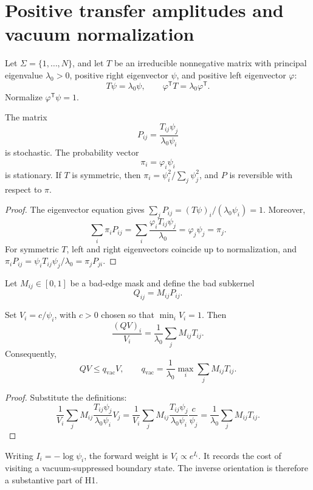\section{Positive transfer amplitudes and vacuum normalization}

Let \(\Sigma=\{1,\ldots,N\}\), and let \(T\) be an irreducible nonnegative
matrix with principal eigenvalue \(\lambda_0>0\), positive right eigenvector
\(\psi\), and positive left eigenvector \(\varphi\):
\begin{equation}
 T\psi=\lambda_0\psi,
 \qquad
 \varphi^{\mathsf T}T=\lambda_0\varphi^{\mathsf T}.
\end{equation}
Normalize \(\varphi^{\mathsf T}\psi=1\).

\begin{theorem}
The matrix
\begin{equation}
 P_{ij}=\frac{T_{ij}\psi_j}{\lambda_0\psi_i}
\end{equation}
is stochastic.  The probability vector
\begin{equation}
 \pi_i=\varphi_i\psi_i
\end{equation}
is stationary.  If \(T\) is symmetric, then
\(\pi_i=\psi_i^2/\sum_j\psi_j^2\), and \(P\) is reversible with respect to
\(\pi\).
\end{theorem}

\begin{proof}
The eigenvector equation gives
\(
 \sum_jP_{ij}=(T\psi)_i/(\lambda_0\psi_i)=1.
\)
Moreover,
\[
 \sum_i\pi_iP_{ij}
 =\sum_i\frac{\varphi_iT_{ij}\psi_j}{\lambda_0}
 =\varphi_j\psi_j=\pi_j.
\]
For symmetric \(T\), left and right eigenvectors coincide up to
normalization, and
\(\pi_iP_{ij}=\psi_iT_{ij}\psi_j/\lambda_0=\pi_jP_{ji}\).
\end{proof}

Let \(M_{ij}\in[0,1]\) be a bad-edge mask and define the bad subkernel
\begin{equation}
 Q_{ij}=M_{ij}P_{ij}.
\end{equation}

\begin{theorem}
Set \(V_i=c/\psi_i\), with \(c>0\) chosen so that \(\min_iV_i=1\).  Then
\begin{equation}\label{eq:inverse-cancel}
 \frac{(QV)_i}{V_i}
 =\frac{1}{\lambda_0}\sum_jM_{ij}T_{ij}.
\end{equation}
Consequently,
\begin{equation}
 QV\le q_{\mathrm{vac}}V,
 \qquad
 q_{\mathrm{vac}}
 =\frac{1}{\lambda_0}\max_i\sum_jM_{ij}T_{ij}.
\end{equation}
\end{theorem}

\begin{proof}
Substitute the definitions:
\[
 \frac1{V_i}\sum_jM_{ij}
 \frac{T_{ij}\psi_j}{\lambda_0\psi_i}V_j
 =\frac1{V_i}\sum_jM_{ij}
 \frac{T_{ij}\psi_j}{\lambda_0\psi_i}\frac{c}{\psi_j}
 =\frac1{\lambda_0}\sum_jM_{ij}T_{ij}.
\]
\end{proof}

Writing \(I_i=-\log\psi_i\), the forward weight is
\(V_i\propto e^{I_i}\).  It records the cost of visiting a vacuum-suppressed
boundary state.  The inverse orientation is therefore a substantive part of
H1.
